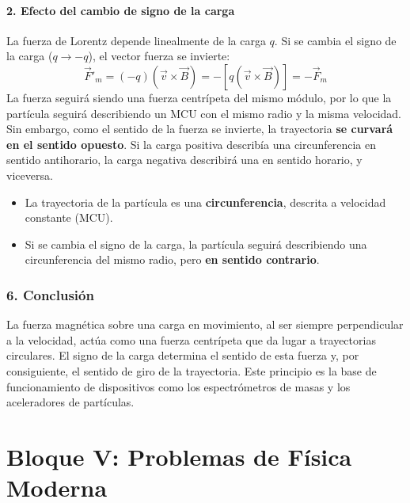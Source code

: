 \paragraph*{2. Efecto del cambio de signo de la carga}
La fuerza de Lorentz depende linealmente de la carga $q$. Si se cambia el signo de la carga ($q \to -q$), el vector fuerza se invierte:
$$ \vec{F}'_m = (-q)(\vec{v} \times \vec{B}) = -[q(\vec{v} \times \vec{B})] = -\vec{F}_m $$
La fuerza seguirá siendo una fuerza centrípeta del mismo módulo, por lo que la partícula seguirá describiendo un MCU con el mismo radio y la misma velocidad. Sin embargo, como el sentido de la fuerza se invierte, la trayectoria \textbf{se curvará en el sentido opuesto}. Si la carga positiva describía una circunferencia en sentido antihorario, la carga negativa describirá una en sentido horario, y viceversa.

\begin{cajaresultado}
\begin{itemize}
    \item La trayectoria de la partícula es una \textbf{circunferencia}, descrita a velocidad constante (MCU).
    \item Si se cambia el signo de la carga, la partícula seguirá describiendo una circunferencia del mismo radio, pero \textbf{en sentido contrario}.
\end{itemize}
\end{cajaresultado}

\subsubsection*{6. Conclusión}
\begin{cajaconclusion}
La fuerza magnética sobre una carga en movimiento, al ser siempre perpendicular a la velocidad, actúa como una fuerza centrípeta que da lugar a trayectorias circulares. El signo de la carga determina el sentido de esta fuerza y, por consiguiente, el sentido de giro de la trayectoria. Este principio es la base de funcionamiento de dispositivos como los espectrómetros de masas y los aceleradores de partículas.
\end{cajaconclusion}

\newpage

\section{Bloque V: Problemas de Física Moderna}
\label{sec:moderna_2007_jun_ord}

